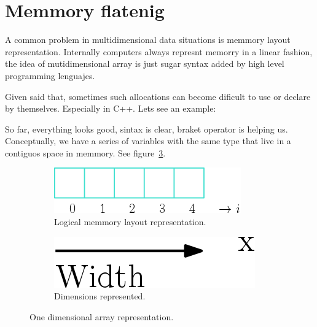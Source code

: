 \section{Memmory flatenig}

A common problem in multidimensional data situations is memmory layout representation. Internally computers always represnt memorry in a linear fashion, the idea of mutidimensional array is just sugar syntax added by high level programming lenguajes.

Given said that, sometimes such allocations can become dificult to use or declare by themselves. Especially in C++. Lets see an example:

{\centering
\begin{minipage}{\linewidth}
\end{minipage}
\par
}
\vspace{0.5cm}
So far, everything looks good, sintax is clear, braket operator is helping us. 
Conceptually, we have a series of variables with the same type that live in a contiguos space in memmory. See figure~\ref{fig:1D}.

\begin{figure}[htp]
  \centering
  \begin{subfigure}[b]{0.35\textwidth}
    \includegraphics[width=\textwidth]{img/array1D}
    \caption{Logical memmory layout representation.}
  \label{fig:1a}
  \end{subfigure}
  \hspace*{4cm}
  \begin{subfigure}[b]{0.25\textwidth}
    \includegraphics[width=\textwidth]{img/arrow1D}
    \caption{Dimensions represented.}
    \label{fig:1b}
  \end{subfigure}
  \caption{One dimensional array representation.}
  \label{fig:1D}
\end{figure}

